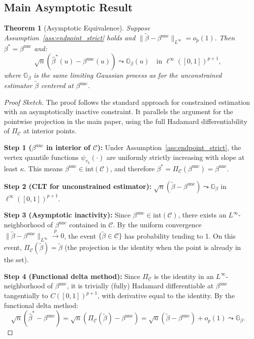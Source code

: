 \documentclass[12pt]{article}
\newtheorem{theorem}{Theorem}
\begin{document}
\subsection{Main Asymptotic Result}

\begin{theorem}[Asymptotic Equivalence]\label{thm:asymptotic}
Suppose Assumption~\ref{ass:endpoint_strict} holds and $\|\tilde{\beta} - \beta^{\text{unc}}\|_{L^\infty} = o_p(1)$. Then $\beta^* = \beta^{\text{unc}}$ and:
\[
\sqrt{n}(\hat{\beta}^*(u) - \beta^{\text{unc}}(u)) \leadsto \mathbb{G}_\beta(u) \quad \text{in } \ell^\infty([0,1])^{p+1},
\]
where $\mathbb{G}_\beta$ is the same limiting Gaussian process as for the unconstrained estimator $\tilde{\beta}$ centered at $\beta^{\text{unc}}$.
\end{theorem}

\begin{proof}[Proof Sketch]
The proof follows the standard approach for constrained estimation with an asymptotically inactive constraint. It parallels the argument for the pointwise projection in the main paper, using the full Hadamard differentiability of $\Pi_{\mathcal{C}}$ at interior points.

\textbf{Step 1 ($\beta^{\text{unc}}$ in interior of $\mathcal{C}$):} Under Assumption~\ref{ass:endpoint_strict}, the vertex quantile functions $\psi_{v_k}(\cdot)$ are uniformly strictly increasing with slope at least $\kappa$. This means $\beta^{\text{unc}} \in \text{int}(\mathcal{C})$, and therefore $\beta^* = \Pi_{\mathcal{C}}(\beta^{\text{unc}}) = \beta^{\text{unc}}$.

\textbf{Step 2 (CLT for unconstrained estimator):} $\sqrt{n}(\tilde{\beta} - \beta^{\text{unc}}) \leadsto \mathbb{G}_\beta$ in $\ell^\infty([0,1])^{p+1}$.

\textbf{Step 3 (Asymptotic inactivity):} Since $\beta^{\text{unc}} \in \text{int}(\mathcal{C})$, there exists an $L^\infty$-neighborhood of $\beta^{\text{unc}}$ contained in $\mathcal{C}$. By the uniform convergence $\|\tilde{\beta} - \beta^{\text{unc}}\|_{L^\infty} \overset{p}{\to} 0$, the event $\{\tilde{\beta} \in \mathcal{C}\}$ has probability tending to 1. On this event, $\Pi_{\mathcal{C}}(\tilde{\beta}) = \tilde{\beta}$ (the projection is the identity when the point is already in the set).

\textbf{Step 4 (Functional delta method):} Since $\Pi_{\mathcal{C}}$ is the identity in an $L^\infty$-neighborhood of $\beta^{\text{unc}}$, it is trivially (fully) Hadamard differentiable at $\beta^{\text{unc}}$ tangentially to $C([0,1])^{p+1}$, with derivative equal to the identity. By the functional delta method:
\[
\sqrt{n}(\hat{\beta}^* - \beta^{\text{unc}}) = \sqrt{n}(\Pi_{\mathcal{C}}(\tilde{\beta}) - \beta^{\text{unc}}) = \sqrt{n}(\tilde{\beta} - \beta^{\text{unc}}) + o_p(1) \leadsto \mathbb{G}_\beta.
\]
\end{proof}
\end{document}
